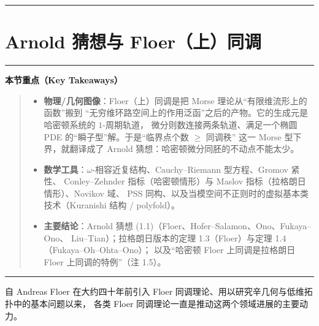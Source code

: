 \documentclass[UTF8,a4paper,11pt,fontset=windows]{ctexart}
\theoremstyle{cnthm}
\numberwithin{equation}{section}
\newenvironment{keytake}%
  {\par\medskip\noindent\rule{\linewidth}{0.5pt}\par\nopagebreak\vspace{3pt}%
   \noindent\textbf{本节重点（Key Takeaways）}\par\nopagebreak\vspace{2pt}%
   \begingroup\setlength{\topsep}{0pt}\setlength{\partopsep}{0pt}%
   \begin{quote}\small\setlength{\itemsep}{2pt}\setlength{\parskip}{0pt}}%
  {\end{quote}\endgroup\vspace{1pt}\noindent\rule{\linewidth}{0.5pt}\par\medskip}
\begin{document}
\vspace{4pt}

\tableofcontents
\vspace{6pt}
\noindent\rule{\linewidth}{0.5pt}
\newpage


\section{Arnold 猜想与 Floer（上）同调}

\begin{keytake}
\begin{itemize}[leftmargin=1.3em,itemsep=2pt,topsep=0pt]
  \item \textbf{物理/几何图像}：Floer（上）同调是把 Morse 理论从“有限维流形上的函数”搬到
        “无穷维环路空间上的作用泛函”之后的产物。它的生成元是哈密顿系统的 $1$-周期轨道，
        微分则数连接两条轨道、满足一个椭圆 PDE 的“瞬子型”解。于是“临界点个数 $\ge$ 同调秩”
        这一 Morse 型下界，就翻译成了 Arnold 猜想：哈密顿微分同胚的不动点不能太少。
  \item \textbf{数学工具}：$\omega$-相容近复结构、Cauchy--Riemann 型方程、Gromov 紧性、
        Conley--Zehnder 指标（哈密顿情形）与 Maslov 指标（拉格朗日情形）、Novikov 域、
        PSS 同构、以及当模空间不正则时的虚拟基本类技术（Kuranishi 结构 / polyfold）。
  \item \textbf{主要结论}：Arnold 猜想 (1.1)（Floer、Hofer--Salamon、Ono、Fukaya--Ono、
        Liu--Tian）；拉格朗日版本的定理 1.3（Floer）与定理 1.4（Fukaya--Oh--Ohta--Ono）；
        以及“哈密顿 Floer 上同调是拉格朗日 Floer 上同调的特例”（注 1.5）。
\end{itemize}
\end{keytake}

自 Andreas Floer 在大约四十年前引入 Floer 同调理论、用以研究辛几何与低维拓扑中的基本问题以来，
各类 Floer 同调理论一直是推动这两个领域进展的主要动力。
\end{document}

